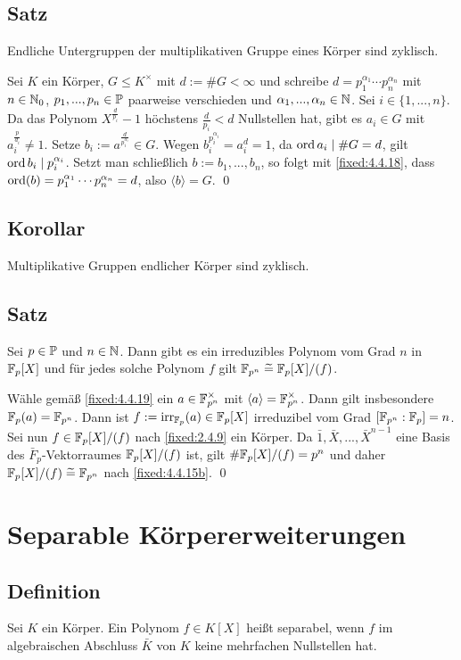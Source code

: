\subsection{Satz} Endliche Untergruppen der multiplikativen Gruppe eines Körper sind zyklisch.

\proof Sei $K$ ein Körper, $G \leq K^\times$ mit $d := \#G < \infty$ und schreibe $d = p_1^{\alpha_1} \cdots p_n^{\alpha_n}$ mit $n \in \N_0$, $p_1,...,p_n \in \P$ paarweise verschieden und $\alpha_1,...,\alpha_n \in \N$. Sei $i \in \{1,...,n\}$. Da das Polynom $X^\frac{d}{p_i} - 1$ höchstens $\frac{d}{p_i} < d$ Nullstellen hat, gibt es $a_i \in G$ mit $a_i^\frac{p}{d_i} \neq 1$. Setze $b_i := a^\frac{d}{p_i^{\alpha_i}} \in G$. Wegen $b_i^{p_i^{\alpha_i}} = a_i^d = 1$, da $\ord a_i \mid \#G=d$, gilt $\ord b_i \mid p_i^{\alpha_i}$. Setzt man schließlich $b := b_1,...,b_n$, so folgt mit \ref{fixed:4.4.18}, dass $\ord(b) = p_1^{\alpha_1} \cdots p_n^{\alpha_n} = d$, also $\langle b \rangle = G$. \qed

\subsection{Korollar} Multiplikative Gruppen endlicher Körper sind zyklisch.

\subsection{Satz} Sei $p \in \P$ und $n \in \N$. Dann gibt es ein irreduzibles Polynom vom Grad $n$ in $\F_p[X]$ und für jedes solche Polynom $f$ gilt $\F_{p^n} \eqtilde \F_p[X]/(f)$.

\proof Wähle gemäß \ref{fixed:4.4.19} ein $a \in \F_{p^n}^\times$ mit $\langle a \rangle = \F_{p^n}^\times$. Dann gilt insbesondere $\F_p(a) = \F_{p^n}$. Dann ist $f := \irr_{\F_p}(a) \in \F_p[X]$ irreduzibel vom Grad $[\F_{p^n} : \F_p] = n$. Sei nun $f \in \F_p[X]/(f)$ nach \ref{fixed:2.4.9} ein Körper. Da $\bar 1, \bar X, ..., \bar X^{n-1}$ eine Basis des $\bar F_p$-Vektorraumes $\F_p[X]/(f)$ ist, gilt $\#\F_p[X]/(f) = p^n$ und daher $\F_p[X]/(f) \eqtilde \F_{p^n}$ nach \ref{fixed:4.4.15b}. \qed

\section{Separable Körpererweiterungen}

\subsection{Definition} Sei $K$ ein Körper. Ein Polynom $f \in K[X]$ heißt separabel, wenn $f$ im algebraischen Abschluss $\bar K$ von $K$ keine mehrfachen Nullstellen hat.

